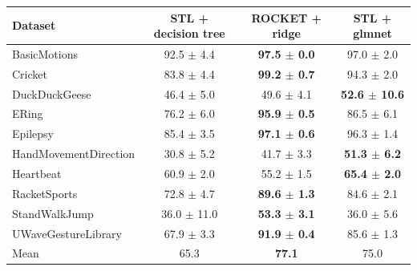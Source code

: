 \begin{tabular}{lccc}
\toprule
Dataset & STL + decision tree & ROCKET + ridge & STL + glmnet \\
\midrule
BasicMotions & 92.5 $\pm$ 4.4 & \textbf{97.5 $\pm$ 0.0} & 97.0 $\pm$ 2.0 \\
Cricket & 83.8 $\pm$ 4.4 & \textbf{99.2 $\pm$ 0.7} & 94.3 $\pm$ 2.0 \\
DuckDuckGeese & 46.4 $\pm$ 5.0 & 49.6 $\pm$ 4.1 & \textbf{52.6 $\pm$ 10.6} \\
ERing & 76.2 $\pm$ 6.0 & \textbf{95.9 $\pm$ 0.5} & 86.5 $\pm$ 6.1 \\
Epilepsy & 85.4 $\pm$ 3.5 & \textbf{97.1 $\pm$ 0.6} & 96.3 $\pm$ 1.4 \\
HandMovementDirection & 30.8 $\pm$ 5.2 & 41.7 $\pm$ 3.3 & \textbf{51.3 $\pm$ 6.2} \\
Heartbeat & 60.9 $\pm$ 2.0 & 55.2 $\pm$ 1.5 & \textbf{65.4 $\pm$ 2.0} \\
RacketSports & 72.8 $\pm$ 4.7 & \textbf{89.6 $\pm$ 1.3} & 84.6 $\pm$ 2.1 \\
StandWalkJump & 36.0 $\pm$ 11.0 & \textbf{53.3 $\pm$ 3.1} & 36.0 $\pm$ 5.6 \\
UWaveGestureLibrary & 67.9 $\pm$ 3.3 & \textbf{91.9 $\pm$ 0.4} & 85.6 $\pm$ 1.3 \\
\midrule
Mean & 65.3 & \textbf{77.1} & 75.0 \\
\bottomrule
\end{tabular}
